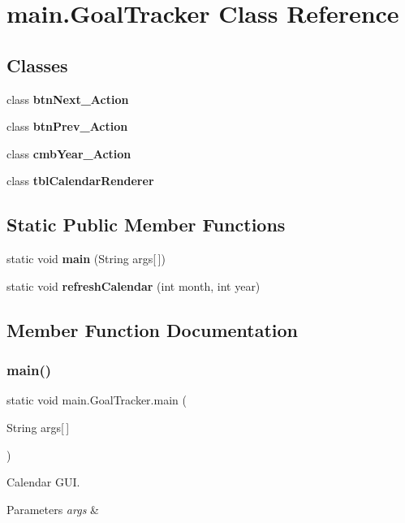 \section{main.\+Goal\+Tracker Class Reference}
\label{classmain_1_1_goal_tracker}
\subsection*{Classes}
\begin{DoxyCompactItemize}
\item 
class {\bfseries btn\+Next\+\_\+\+Action}
\item 
class {\bfseries btn\+Prev\+\_\+\+Action}
\item 
class {\bfseries cmb\+Year\+\_\+\+Action}
\item 
class {\bfseries tbl\+Calendar\+Renderer}
\end{DoxyCompactItemize}
\subsection*{Static Public Member Functions}
\begin{DoxyCompactItemize}
\item 
static void \textbf{ main} (String args[$\,$])
\item 
static void \textbf{ refresh\+Calendar} (int month, int year)
\end{DoxyCompactItemize}


\subsection{Member Function Documentation}
\mbox{\label{classmain_1_1_goal_tracker_a2039c98750da8b2c3136ff42d2682307}} 
\subsubsection{main()}
{\footnotesize\ttfamily static void main.\+Goal\+Tracker.\+main (\begin{DoxyParamCaption}\item[{String}]{args[$\,$] }\end{DoxyParamCaption})\hspace{0.3cm}{\ttfamily [static]}}

Calendar G\+UI. 
\begin{DoxyParams}{Parameters}
{\em args} & \\
\hline
\end{DoxyParams}
\mbox{\label{classmain_1_1_goal_tracker_a8257e39078e30681f0cc19ebc86d2041}} 
